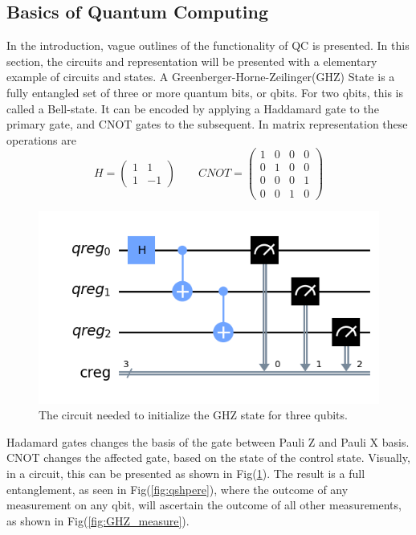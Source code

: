 \subsection{Basics of Quantum Computing}
In the introduction, vague outlines of the functionality of QC is presented. In this section, the circuits and representation will be presented with a elementary example of circuits and states. A Greenberger-Horne-Zeilinger(GHZ) State is a  fully entangled set of three or more quantum bits, or qbits. For two qbits, this is called a Bell-state. It can be encoded by applying a Haddamard gate to the primary gate, and CNOT gates to the subsequent. In matrix representation these operations are
\begin{equation}
    H = \begin{pmatrix}
    1 & 1 \\
    1 & -1 
    \end{pmatrix} \qquad 
    CNOT = \begin{pmatrix}
    1 & 0 & 0 & 0 \\
    0 & 1 & 0 & 0 \\
    0 & 0 & 0 & 1 \\
    0 & 0 & 1 & 0 
    \end{pmatrix}
\end{equation}
\begin{figure}
    \centering
    \includegraphics{figs/GHZ.png}
    \caption{The circuit needed to initialize the GHZ state for three qubits.}
    \label{fig:GHZ_circ}
\end{figure}
Hadamard gates changes the basis of the gate between Pauli Z and Pauli X basis. CNOT changes the affected gate, based on the state of the control state. Visually, in a circuit, this can be presented as shown in Fig(\ref{fig:GHZ_circ}).
The result is a full entanglement, as seen in Fig(\ref{fig:qshpere}), where the outcome of any measurement on any qbit, will ascertain the outcome of all other measurements, as shown in Fig(\ref{fig:GHZ_measure}).
